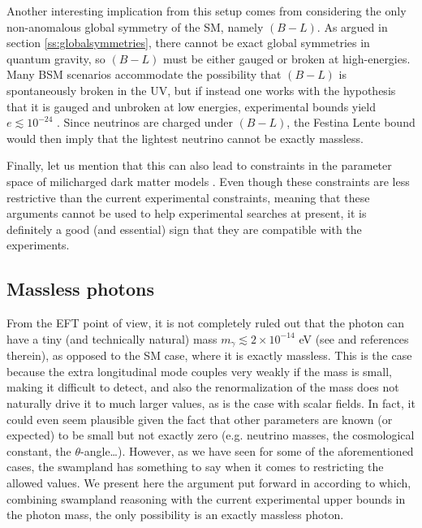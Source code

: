 \documentclass[11pt,a4paper]{article}
\begin{document}
Another interesting implication from this setup comes from considering the only non-anomalous global symmetry of the SM, namely $(B-L)$. As argued in section \ref{ss:globalsymmetries}, there cannot be exact global symmetries in quantum gravity, so $(B-L)$ must be either gauged or broken at high-energies. Many BSM scenarios accommodate the possibility  that $(B-L)$ is spontaneously broken in the UV, but if instead one works with the hypothesis that it is gauged and unbroken at low energies, experimental bounds yield $e\lesssim 10^{-24}$ \cite{Cheung:2014vva,Craig:2019fdy}. Since neutrinos are charged under $(B-L)$, the Festina Lente bound would then imply that the lightest neutrino cannot be exactly massless.

Finally, let us mention that this can also lead to constraints in the parameter space of milicharged dark matter models \cite{Montero:2019ekk}. Even though these constraints are less restrictive than the current experimental constraints, meaning that these arguments cannot be used to help experimental searches at present, it is definitely a good (and essential) sign that they are compatible with the experiments.

\subsection{Massless photons}

From the EFT point of view, it is not completely ruled out that the photon can have a tiny (and technically natural) mass $m_{\gamma} \lesssim 2\times 10^{-14}$ eV (see \cite{Reece:2018zvv} and references therein), as opposed to the SM case, where it is exactly massless. This is the case because the extra longitudinal mode couples very weakly if the mass is small, making it difficult to detect, and also the renormalization of the mass does not naturally drive it to much larger values, as is the case with scalar fields. In fact, it could even seem plausible given the fact that other  parameters are known (or expected) to be small but not exactly zero (e.g. neutrino masses, the cosmological constant, the $\theta$-angle\ldots). However, as we have seen for some of the aforementioned cases, the swampland has something to say when it comes to restricting the allowed values. We present here the argument put forward in \cite{Reece:2018zvv} according to which, combining swampland reasoning with the current experimental upper bounds in the photon mass, the only possibility is an exactly massless photon.
\end{document}
